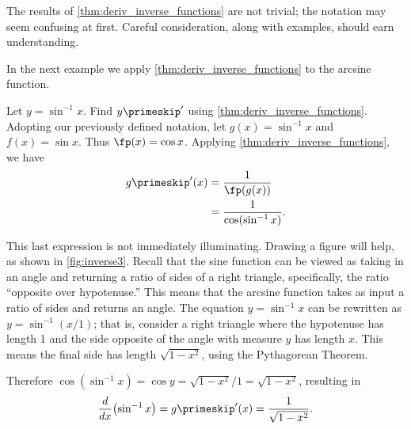 The results of \autoref{thm:deriv_inverse_functions} are not trivial; the notation may seem confusing at first. Careful consideration, along with examples, should earn understanding.


In the next example we apply \autoref{thm:deriv_inverse_functions} to the arcsine function.

\begin{example}\label{ex_deriv_arcsin}
Let $y = \sin^{-1} x$. Find $y\primeskip'$ using \autoref{thm:deriv_inverse_functions}.
\solution
Adopting our previously defined notation, let $g(x) = \sin^{-1} x$ and $f(x) = \sin x$. Thus $\fp(x) = \cos x$. Applying \autoref{thm:deriv_inverse_functions}, we have 
\begin{align*}
	g\primeskip'(x) &= \frac{1}{\fp(g(x))} \\
	&= \frac{1}{\cos(\sin^{-1}x)}.
\end{align*}
			

This last expression is not immediately illuminating. Drawing a figure will help, as shown in \autoref{fig:inverse3}. Recall that the sine function can be viewed as taking in an angle and returning a ratio of sides of a right triangle, specifically, the ratio ``opposite over hypotenuse.'' This means that the arcsine function takes as input a ratio of sides and returns an angle. The equation $y=\sin^{-1} x$ can be rewritten as $y=\sin^{-1}(x/1)$; that is, consider a right triangle where the hypotenuse has length 1 and the side opposite of the angle with measure $y$ has length $x$. This means the final side has length $\sqrt{1-x^2}$, using the Pythagorean Theorem.

Therefore $\cos (\sin^{-1} x) = \cos y = \sqrt{1-x^2}/1 = \sqrt{1-x^2}$, resulting in \[\frac d{dx}\bigl(\sin^{-1}x\bigr)=g\primeskip'(x)=\frac1{\sqrt{1-x^2}}.\]
\end{example}

